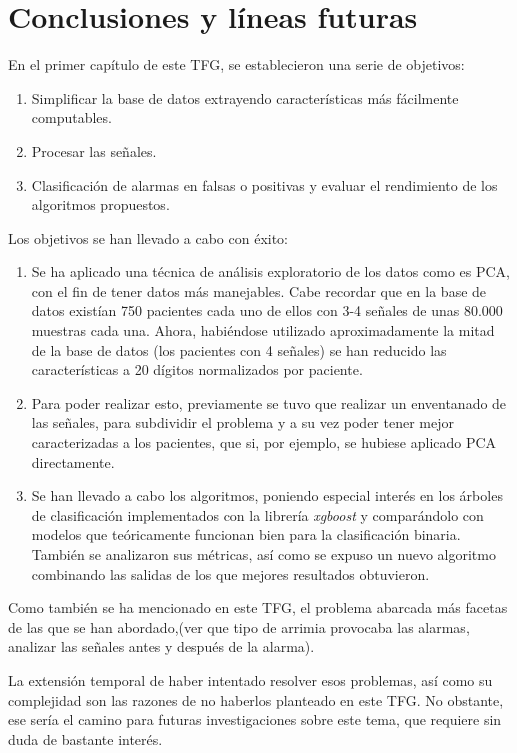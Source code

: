 \chapter{Conclusiones y líneas futuras}

En el primer capítulo de este TFG, se establecieron una serie de objetivos:
\begin{enumerate}
	\item Simplificar la base de datos extrayendo características más fácilmente computables.
	\item Procesar las señales.
	\item Clasificación de alarmas en falsas o positivas y evaluar el rendimiento de los algoritmos propuestos.
\end{enumerate}

Los objetivos se han llevado a cabo con éxito:
\begin{enumerate}
	\item Se ha aplicado una técnica de análisis exploratorio de los datos como es PCA, con el fin de tener datos más manejables. Cabe recordar que en la base de datos existían 750 pacientes cada uno de ellos con 3-4 señales de unas 80.000 muestras cada una. 
	Ahora, habiéndose utilizado aproximadamente la mitad de la base de datos (los pacientes con 4 señales) se han reducido las características a 20 dígitos normalizados por paciente.
	\item Para poder realizar esto, previamente se tuvo que realizar un enventanado de las señales, para subdividir el problema y a su vez poder tener mejor caracterizadas a los pacientes, que si, por ejemplo, se hubiese aplicado PCA directamente.
	\item Se han llevado a cabo los algoritmos, poniendo especial interés en los árboles de clasificación implementados con la librería \textit{xgboost} y comparándolo con modelos que teóricamente funcionan bien para la clasificación binaria.
	También se analizaron sus métricas, así como se expuso un nuevo algoritmo combinando las salidas de los que mejores resultados obtuvieron.
\end{enumerate}

Como también se ha mencionado en este TFG, el problema abarcada más facetas de las que se han abordado,(ver que tipo de arrimia provocaba las alarmas, analizar las señales antes y después de la alarma).\par 
La extensión temporal de haber intentado resolver esos problemas, así como su complejidad son las razones de no haberlos planteado en este TFG. No obstante, ese sería el camino para futuras investigaciones sobre este tema, que requiere sin duda de bastante interés. \par 


